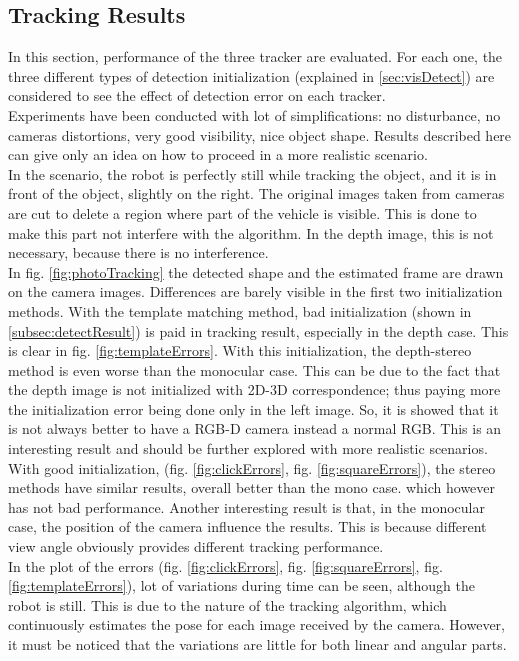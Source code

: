 \subsection{Tracking Results}
\label{subsec:trackResult}

In this section, performance of the three tracker are evaluated. For each one, the three different types of detection initialization (explained in \ref{sec:visDetect}) are considered to see the effect of detection error on each tracker.\\
Experiments have been conducted with lot of simplifications: no disturbance, no cameras distortions, very good visibility, nice object shape. Results described here can give only an idea on how to proceed in a more realistic scenario.\\
In the scenario, the robot is perfectly still while tracking the object, and it is in front of the object, slightly on the right. The original images taken from cameras are cut to delete a region where part of the vehicle is visible. This is done to make this part not interfere with the algorithm. In the depth image, this is not necessary, because there is no interference.\\
In fig. \ref{fig:photoTracking} the detected shape and the estimated frame are drawn on the camera images. Differences are barely visible in the first two initialization methods. With the template matching method, bad initialization (shown in \ref{subsec:detectResult}) is paid in tracking result, especially in the depth case. This is clear in fig. \ref{fig:templateErrors}. With this initialization, the depth-stereo method is even worse than the monocular case. This can be due to the fact that the depth image is not initialized with 2D-3D correspondence; thus paying more the initialization error being done only in the left image. So, it is showed that it is not always better to have a RGB-D camera instead a normal RGB. This is an interesting result and should be further explored with more realistic scenarios.\\
With good initialization, (fig. \ref{fig:clickErrors}, fig. \ref{fig:squareErrors}), the stereo methods have similar results, overall better than the mono case. which however has
not bad performance. Another interesting result is that, in the monocular case, the position of the camera influence the results. This is because different view angle obviously provides different tracking performance.\\
In the plot of the errors (fig. \ref{fig:clickErrors}, fig. \ref{fig:squareErrors}, fig. \ref{fig:templateErrors}), lot of variations during time can be seen, although the robot is still. This is due to the nature of the tracking algorithm, which continuously estimates the pose for each image received by the camera. However, it must be noticed that the variations are little for both linear and angular parts.\\

